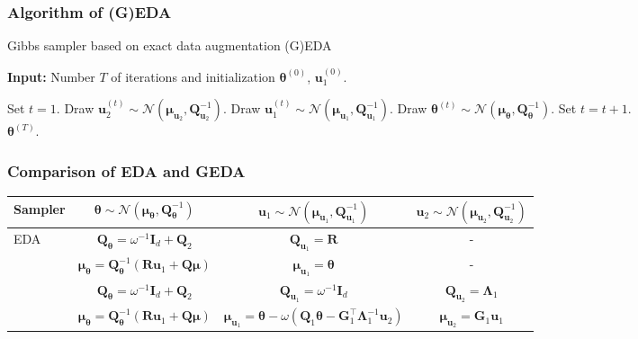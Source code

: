 \documentclass[aspectratio=169]{beamer}
\newcommand{\B}[1]{\mathbf{#1}} %
\newcommand{\Bs}[1]{\boldsymbol{#1}} %
\newcommand{\pr}[1]{\left(#1\right)} %
\begin{document}
\begin{frame}
\frametitle{Algorithm of (G)EDA}
\begin{algorithm}[H]
\caption{Gibbs sampler based on exact data augmentation (G)EDA}
\label{algo:exact_DA}
\hspace*{\algorithmicindent} \textbf{Input:} Number $T$ of iterations and initialization $\Bs{\theta}^{(0)}$, $\B{u}_1^{(0)}$.
\begin{algorithmic}[1]
\State Set $t = 1$.
\State Draw $\B{u}_2^{(t)} \sim \mathcal{N}(\Bs{\mu}_{\B{u}_2},\B{Q}_{\B{u}_2}^{-1})$. \Comment{\textcolor{blue}{Only if GEDA is considered.}}
\State Draw $\B{u}_1^{(t)} \sim \mathcal{N}(\Bs{\mu}_{\B{u}_1},\B{Q}_{\B{u}_1}^{-1})$.
\State Draw $\Bs{\theta}^{(t)} \sim \mathcal{N}(\Bs{\mu}_{\Bs{\theta}},\B{Q}_{\Bs{\theta}}^{-1})$.
\State Set $t = t + 1$.
\EndWhile\\
\Return $\Bs{\theta}^{(T)}$.
\end{algorithmic}
\end{algorithm}
\end{frame}

\begin{frame}
\frametitle{Comparison of EDA and GEDA}
\begin{table}
{\scriptsize
\begin{center}
{\renewcommand{\arraystretch}{2}
\begin{tabular}{|l|c|c|c|} 
  \hline
  \textbf{Sampler} & $\Bs{\theta} \sim \mathcal{N}(\Bs{\mu}_{\Bs{\theta}},\B{Q}_{\Bs{\theta}}^{-1})$ & $\B{u}_1 \sim \mathcal{N}(\Bs{\mu}_{\B{u}_1},\B{Q}_{\B{u}_1}^{-1})$ & $\B{u}_2  \sim \mathcal{N}(\Bs{\mu}_{\B{u}_2},\B{Q}_{\B{u}_2}^{-1})$ \\
  \hline 
  \multirow{3}{*}{EDA} & $\B{Q}_{\Bs{\theta}} = \omega^{-1}\B{I}_d + \B{Q}_2$ & $\B{Q}_{\B{u}_1} = \B{R}$ & - \\
  & $\Bs{\mu}_{\Bs{\theta}} = \B{Q}_{\Bs{\theta}}^{-1}\pr{\B{R}\B{u}_1 + \B{Q}\Bs{\mu}}$ & $\Bs{\mu}_{\B{u}_1} = \Bs{\theta}$ & - \\[0.3em]
  \hline
  \multirow{3}{*}{GEDA} 
  & $\B{Q}_{\Bs{\theta}} = \omega^{-1}\B{I}_d + \B{Q}_2$ 
  & $\B{Q}_{\B{u}_1} = \omega^{-1}\B{I}_d$ & $\B{Q}_{\B{u}_2} = \B{\Lambda}_1$ \\
  & $\Bs{\mu}_{\Bs{\theta}} = \B{Q}_{\Bs{\theta}}^{-1}(\B{R}\B{u}_1 + \B{Q}\Bs{\mu})$ 
  & $\Bs{\mu}_{\B{u}_1} = \Bs{\theta} - \omega(\B{Q}_1\Bs{\theta} -\B{G}_1^{\top}\B{\Lambda}_1^{-1}\B{u}_2)$ & $\Bs{\mu}_{\B{u}_2} = \B{G}_1\B{u}_1$ \\[0.3em]
  \hline
\end{tabular}}
\end{center}
}
\end{table}
\end{frame}
\end{document}
